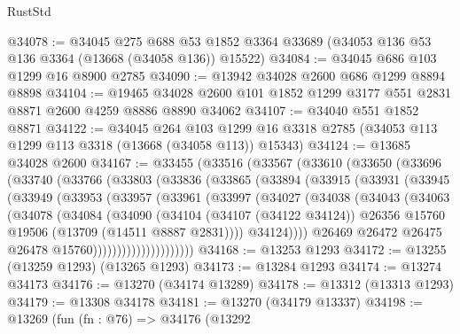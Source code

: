 \begin{lexlean}{RustStd}
\begin{coremodule}
@34078 := @34045
    @275
    @688
    @53
    @1852
    @3364
    @33689
    (@34053 @136 @53 @136 @3364 (@13668 (@34058 @136)) @15522)
@34084 := @34045 @686 @103 @1299 @16 @8900 @2785
@34090 := @13942 @34028 @2600 @686 @1299 @8894 @8898
@34104 := @19465 @34028 @2600 @101 @1852 @1299 @3177 @551 @2831 @8871 @2600 @4259 @8886 @8890 @34062
@34107 := @34040 @551 @1852 @8871
@34122 := @34045
    @264
    @103
    @1299
    @16
    @3318
    @2785
    (@34053 @113 @1299 @113 @3318 (@13668 (@34058 @113)) @15343)
@34124 := @13685 @34028 @2600
@34167 := @33455
    (@33516
      (@33567
        (@33610
          (@33650
            (@33696
              (@33740
                (@33766
                  (@33803
                    (@33836
                      (@33865
                        (@33894
                          (@33915
                            (@33931
                              (@33945
                                (@33949
                                  (@33953
                                    (@33957
                                      (@33961
                                        (@33997
                                          (@34027
                                            (@34038
                                              (@34043
                                                (@34063
                                                  (@34078
                                                    (@34084
                                                      (@34090
                                                        (@34104
                                                          (@34107 (@34122 @34124))
                                                          @26356
                                                          @15760
                                                          @19506
                                                          (@13709 (@14511 @8887 @2831))))
                                                      @34124))))
                                              @26469
                                              @26472
                                              @26475
                                              @26478
                                              @15760)))))))))))))))))))))
@34168 := @13253 @1293
@34172 := @13255 (@13259 @1293) (@13265 @1293)
@34173 := @13284 @1293
@34174 := @13274 @34173
@34176 := @13270 (@34174 @13289)
@34178 := @13312 (@13313 @1293)
@34179 := @13308 @34178
@34181 := @13270 (@34179 @13337)
@34198 := @13269
    (fun (fn : @76) =>
    @34176
      (@13292

\end{coremodule}
\end{lexlean}
